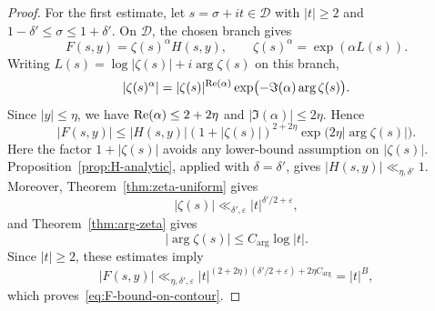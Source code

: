 \begin{proof}
For the first estimate, let $s=\sigma+it\in\mathcal{D}$ with
$|t|\geq2$ and $1-\delta'\leq\sigma\leq1+\delta'$. On
$\mathcal{D}$, the chosen branch gives
\[
    F(s,y)=\zeta(s)^\alpha H(s,y),
    \qquad
    \zeta(s)^\alpha=\exp(\alpha L(s)).
\]
Writing $L(s)=\log|\zeta(s)|+i\arg\zeta(s)$ on this branch,
\[
    |\zeta(s)^\alpha|
    =|\zeta(s)|^{\operatorname{Re}(\alpha)}
     \exp\bigl(-\Im(\alpha)\arg\zeta(s)\bigr).
\]
Since $|y|\leq\eta$, we have $\operatorname{Re}(\alpha)\leq2+2\eta$ and
$|\Im(\alpha)|\leq2\eta$. Hence
\[
    |F(s,y)|
    \leq |H(s,y)| (1+|\zeta(s)|)^{2+2\eta}
       \exp\bigl(2\eta|\arg\zeta(s)|\bigr).
\]
Here the factor $1+|\zeta(s)|$ avoids any lower-bound assumption on
$|\zeta(s)|$. Proposition~\ref{prop:H-analytic}, applied with
$\delta=\delta'$, gives $|H(s,y)|\ll_{\eta,\delta'}1$. Moreover,
Theorem~\ref{thm:zeta-uniform} gives
\[
    |\zeta(s)|\ll_{\delta',\varepsilon}
    |t|^{\delta'/2+\varepsilon},
\]
and Theorem~\ref{thm:arg-zeta} gives
\[
    |\arg\zeta(s)|\leq C_{\arg}\log|t|.
\]
Since $|t|\geq2$, these estimates imply
\[
    |F(s,y)|
    \ll_{\eta,\delta',\varepsilon}
    |t|^{(2+2\eta)(\delta'/2+\varepsilon)+2\eta C_{\arg}}
    = |t|^B,
\]
which proves~\eqref{eq:F-bound-on-contour}.


\end{proof}
